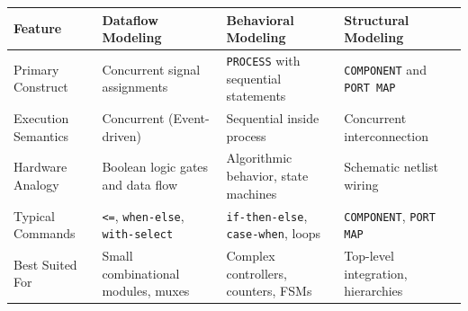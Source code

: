 \documentclass[12pt,a4paper]{article}
\begin{document}
\begin{tcolorbox}[tikzbox, title={\textbf{Summary Matrix: Comparison of VHDL Modeling Styles}}]
\centering
\begingroup
\setlength{\tabcolsep}{4pt}
\setlength{\extrarowheight}{3pt}
\begin{tabularx}{\linewidth}{|B{2.8cm}|Y|Y|Y|}
\hline
\textbf{Feature} & \textbf{Dataflow Modeling} & \textbf{Behavioral Modeling} & \textbf{Structural Modeling} \\
\hline
Primary Construct & Concurrent signal assignments & \texttt{PROCESS} with sequential statements & \texttt{COMPONENT} and \texttt{PORT MAP} \\
\hline
Execution Semantics & Concurrent (Event-driven) & Sequential inside process & Concurrent interconnection \\
\hline
Hardware Analogy & Boolean logic gates and data flow & Algorithmic behavior, state machines & Schematic netlist wiring \\
\hline
Typical Commands & \texttt{<=}, \texttt{when-else}, \texttt{with-select} & \texttt{if-then-else}, \texttt{case-when}, loops & \texttt{COMPONENT}, \texttt{PORT MAP} \\
\hline
Best Suited For & Small combinational modules, muxes & Complex controllers, counters, FSMs & Top-level integration, hierarchies \\
\hline
\end{tabularx}
\endgroup
\end{tcolorbox}
\end{document}

